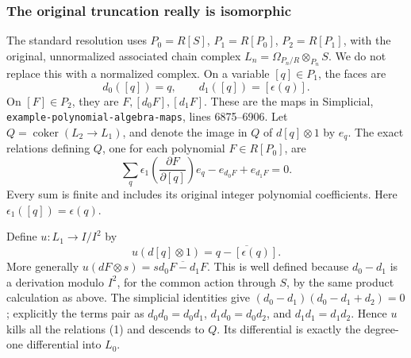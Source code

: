 \subsubsection{The original truncation really is isomorphic}\label{algebra-proof-044-the-original-truncation-really-is-isomorphic}

The standard resolution uses \(P_0=R[S]\), \(P_1=R[P_0]\), \(P_2=R[P_1]\), with the original, unnormalized associated chain complex \(L_n=\Omega_{P_n/R}\otimes_{P_n}S\). We do not replace this with a normalized complex. On a variable \([q]\in P_1\), the faces are \[
d_0([q])=q,\qquad d_1([q])=[\epsilon(q)].
\] On \([F]\in P_2\), they are \(F,[d_0F],[d_1F]\). These are the maps in Simplicial, \texttt{example-polynomial-algebra-maps}, lines 6875--6906. Let \(Q=\operatorname{coker}(L_2\to L_1)\), and denote the image in \(Q\) of \(d[q]\otimes1\) by \(e_q\). The exact relations defining \(Q\), one for each polynomial \(F\in R[P_0]\), are \[
\sum_q \epsilon_1\!\left(\frac{\partial F}{\partial[q]}\right)e_q
-e_{d_0F}+e_{d_1F}=0.\tag{1}
\] Every sum is finite and includes its original integer polynomial coefficients. Here \(\epsilon_1([q])=\epsilon(q)\).

Define \(u:L_1\to I/I^2\) by \[
u(d[q]\otimes1)=\overline{q-[\epsilon(q)]}.
\] More generally \(u(dF\otimes s)=s\overline{d_0F-d_1F}\). This is well defined because \(d_0-d_1\) is a derivation modulo \(I^2\), for the common action through \(S\), by the same product calculation as above. The simplicial identities give \((d_0-d_1)(d_0-d_1+d_2)=0\); explicitly the terms pair as \(d_0d_0=d_0d_1\), \(d_1d_0=d_0d_2\), and \(d_1d_1=d_1d_2\). Hence \(u\) kills all the relations (1) and descends to \(Q\). Its differential is exactly the degree-one differential into \(L_0\).

